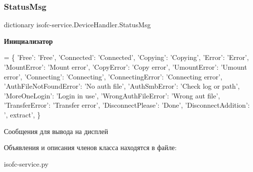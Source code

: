 \subsubsection{\texorpdfstring{Status\+Msg}{StatusMsg}}
{\footnotesize\ttfamily dictionary isofc-\/service.\+Device\+Handler.\+Status\+Msg\hspace{0.3cm}{\ttfamily [static]}}

{\bfseries Инициализатор}
\begin{DoxyCode}
=  \{
        \textcolor{stringliteral}{'Free'}: \textcolor{stringliteral}{'Free'},
        \textcolor{stringliteral}{'Connected'}: \textcolor{stringliteral}{'Connected'},
        \textcolor{stringliteral}{'Copying'}: \textcolor{stringliteral}{'Copying'},
        \textcolor{stringliteral}{'Error'}: \textcolor{stringliteral}{'Error'},
        \textcolor{stringliteral}{'MountError'}: \textcolor{stringliteral}{'Mount error'},
        \textcolor{stringliteral}{'CopyError'}: \textcolor{stringliteral}{'Copy error'},
        \textcolor{stringliteral}{'UmountError'}: \textcolor{stringliteral}{'Umount error'},
        \textcolor{stringliteral}{'Connecting'}: \textcolor{stringliteral}{'Connecting'},
        \textcolor{stringliteral}{'ConnectingError'}: \textcolor{stringliteral}{'Connecting error'},
        \textcolor{stringliteral}{'AuthFileNotFoundError'}: \textcolor{stringliteral}{'No auth file'},
        \textcolor{stringliteral}{'AuthSmbError'}: \textcolor{stringliteral}{'Check log or path'},
        \textcolor{stringliteral}{'MoreOneLogin'}: \textcolor{stringliteral}{'Login in use'},
        \textcolor{stringliteral}{'WrongAuthFileError'}: \textcolor{stringliteral}{'Wrong aut file'},
        \textcolor{stringliteral}{'TransferError'}: \textcolor{stringliteral}{'Transfer error'},
        \textcolor{stringliteral}{'DisconnectPlease'}: \textcolor{stringliteral}{'Done'},
        \textcolor{stringliteral}{'DisconnectAddition'}: \textcolor{stringliteral}{', extract'},
    \}
\end{DoxyCode}


Сообщения для вывода на дисплей 



Объявления и описания членов класса находятся в файле\+:\begin{DoxyCompactItemize}
\item 
isofc-\/service.\+py\end{DoxyCompactItemize}
